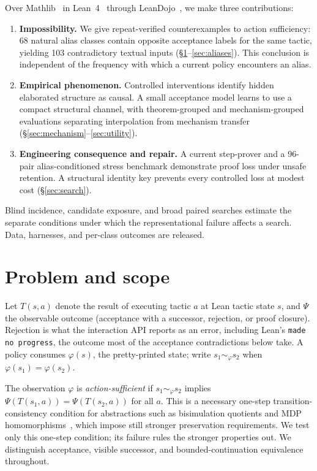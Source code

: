 \documentclass[11pt]{article}
\begin{document}
Over Mathlib~\cite{mathlib2020} in Lean~4~\cite{moura2021lean4} through
LeanDojo~\cite{yang2023leandojo}, we make three contributions:
\begin{enumerate}
\item \textbf{Impossibility.} We give repeat-verified counterexamples to action
sufficiency: 68 natural alias classes contain opposite acceptance labels for
the same tactic, yielding 103 contradictory textual inputs
(\S\ref{sec:formal}--\ref{sec:aliases}). This conclusion is independent of the
frequency with which a current policy encounters an alias.
\item \textbf{Empirical phenomenon.} Controlled interventions identify hidden
elaborated structure as causal. A small acceptance model learns to use a compact
structural channel, with theorem-grouped and mechanism-grouped evaluations
separating interpolation from mechanism transfer
(\S\ref{sec:mechanism}--\ref{sec:utility}).
\item \textbf{Engineering consequence and repair.} A current step-prover and a
96-pair alias-conditioned stress benchmark demonstrate proof loss under unsafe
retention. A structural identity key prevents every controlled loss at modest
cost (\S\ref{sec:search}).
\end{enumerate}
Blind incidence, candidate exposure, and broad paired searches estimate the
separate conditions under which the representational failure affects a search.
Data, harnesses, and per-class outcomes are released.

\section{Problem and scope}
\label{sec:formal}

Let $T(s,a)$ denote the result of executing tactic $a$ at Lean tactic state
$s$, and $\Psi$ the observable outcome (acceptance with a successor, rejection,
or proof closure). Rejection is what the interaction API reports as an error,
including Lean's \texttt{made no progress}, the outcome most of the acceptance
contradictions below take. A policy consumes $\varphi(s)$, the pretty-printed
state; write $s_1 \sim_\varphi s_2$ when $\varphi(s_1)=\varphi(s_2)$.

The observation $\varphi$ is \emph{action-sufficient} if $s_1 \sim_\varphi
s_2$ implies $\Psi(T(s_1,a))=\Psi(T(s_2,a))$ for all $a$. This is a necessary
one-step transition-consistency condition for abstractions such as bisimulation
quotients and MDP homomorphisms~\cite{givan2003equivalence,li2006towards},
which impose still stronger preservation requirements. We test only this
one-step condition; its failure rules the stronger properties out. We
distinguish acceptance, visible successor, and bounded-continuation equivalence
throughout.
\end{document}
